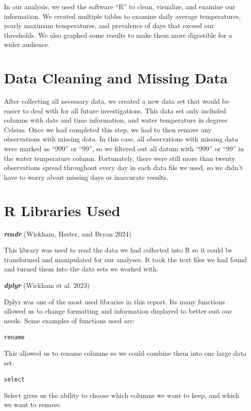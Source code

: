 \documentclass[
  letterpaper,
  DIV=11,
  numbers=noendperiod]{scrreprt}
\begin{document}
In our analysis, we used the software ``R'' to clean, visualize, and
examine our information. We created multiple tables to examine daily
average temperatures, yearly maximum temperatures, and prevalence of
days that exceed our thresholds. We also graphed some results to make
them more digestible for a wider audience.

\section{Data Cleaning and Missing
Data}\label{data-cleaning-and-missing-data}

After collecting all necessary data, we created a new data set that
would be easier to deal with for all future investigations. This data
set only included columns with date and time information, and water
temperature in degrees Celsius. Once we had completed this step, we had
to then remove any observations with missing data. In this case, all
observations with missing data were marked as ``999'' or ``99'', so we
filtered out all datum with ``999'' or ``99'' in the water temperature
column. Fortunately, there were still more than twenty observations
spread throughout every day in each data file we used, so we didn't have
to worry about missing days or inaccurate results.

\section{R Libraries Used}\label{r-libraries-used}

\textbf{\emph{readr}} (Wickham, Hester, and Bryan 2024)

This library was used to read the data we had collected into R so it
could be transformed and manipulated for our analyses. It took the text
files we had found and turned them into the data sets we worked with.

\textbf{\emph{dplyr}} (Wickham et al. 2023)

Dplyr was one of the most used libraries in this report. Its many
functions allowed us to change formatting and information displayed to
better suit our needs. Some examples of functions used are:

\texttt{rename}

This allowed us to rename columns so we could combine them into one
large data set.

\texttt{select}

Select gives us the ability to choose which columns we want to keep, and
which we want to remove.
\end{document}
